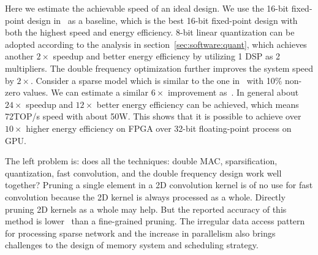 Here we estimate the achievable speed of an ideal design. We use the 16-bit fixed-point design in~\cite{lu2017evaluating} as a baseline, which is the best 16-bit fixed-point design with both the highest speed and energy efficiency. 8-bit linear quantization can be adopted according to the analysis in section~\ref{sec:software:quant}, which achieves another $2\times$ speedup and better energy efficiency by utilizing 1 DSP as 2 multipliers. The double frequency optimization further improves the system speed by $2\times$. Consider a sparse model which is similar to the one in~\cite{han2017ese} with 10\% non-zero values. We can estimate a similar $6\times$ improvement as~\cite{han2017ese}. In general about $24\times$ speedup and $12\times$ better energy efficiency can be achieved, which means 72TOP/s speed with about 50W. This shows that it is possible to achieve over $10\times$ higher energy efficiency on FPGA over 32-bit floating-point process on GPU.

The left problem is: does all the techniques: double MAC, sparsification, quantization, fast convolution, and the double frequency design work well together? Pruning a single element in a 2D convolution kernel is of no use for fast convolution because the 2D kernel is always processed as a whole. Directly pruning 2D kernels as a whole may help. But the reported accuracy of this method is lower~\cite{Mao2017Exploring} than a fine-grained pruning. The irregular data access pattern for processing sparse network and the increase in parallelism also brings challenges to the design of memory system and scheduling strategy.


